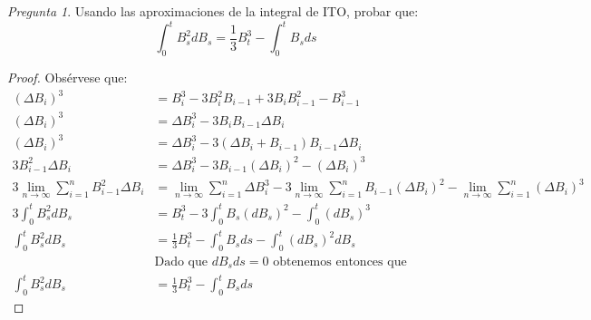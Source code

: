 \documentclass[11pt]{article}
\theoremstyle{definition}
\theoremstyle{remark}
\theoremstyle{remark}
\newtheorem{question}{Pregunta}
\begin{document}
\begin{question}
    Usando las aproximaciones de la integral de ITO, probar que:
  \begin{equation*}
    \int_0^tB_s^2dB_s = \frac{1}{3}B_t^3 - \int_0^tB_sds
  \end{equation*}
\end{question}
\begin{proof}
  Obsérvese que:
  \begin{align*}
    (\Delta B_i)^3 &= B_i^3 - 3B_i^2B_{i-1} + 3B_iB_{i - 1}^2 - B_{i-1}^3 \\
    (\Delta B_i)^3 &= \Delta B_i^3 - 3B_iB_{i - 1}\Delta B_i \\
    (\Delta B_i)^3 &= \Delta B_i^3 - 3(\Delta B_i + B_{i - 1})B_{i - 1} \Delta B_i \\
    3B_{i - 1}^2\Delta B_i &= \Delta B_i^3 - 3B_{i - 1}(\Delta B_i)^2 - (\Delta B_i)^3 \\
    3\lim_{n \rightarrow \infty}\sum_{i =1}^{n} B_{i - 1}^2\Delta B_i &=
    \lim_{n \rightarrow \infty}\sum_{i =1}^{n}\Delta B_i^3 -
   3\lim_{n \rightarrow \infty}\sum_{i =1}^{n}B_{i - 1}(\Delta B_i)^2
    - \lim_{n \rightarrow \infty}\sum_{i =1}^{n} (\Delta B_i)^3 \\
    3 \int_0^tB_s^2dB_s &= B_t^3 - 3\int_0^tB_s (dB_s)^2 - \int_0^t(dB_s)^3 \\
    \int_0^tB_s^2dB_s &= \frac{1}{3}B_t^3 - \int_0^tB_s ds - \int_0^t(dB_s)^2 dB_s \\
    &\text{Dado que } dB_s ds = 0 \text{ obtenemos entonces que } \\
        \int_0^tB_s^2dB_s &= \frac{1}{3}B_t^3 - \int_0^tB_s ds
  \end{align*}
\end{proof}
\end{document}
